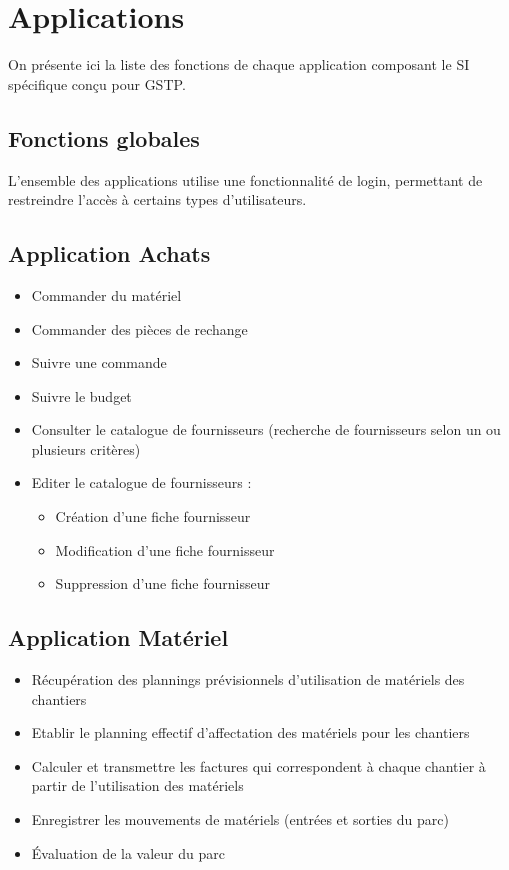 \section{Applications}

On présente ici la liste des fonctions de chaque application composant le
SI spécifique conçu pour GSTP.


\subsection{Fonctions globales}

L'ensemble des applications utilise une fonctionnalité de login, permettant
de restreindre l'accès à certains types d'utilisateurs.


\subsection{Application Achats}

\begin{itemize}
\item Commander du matériel
\item Commander des pièces de rechange
\item Suivre une commande
\item Suivre le budget
\item Consulter le catalogue de fournisseurs (recherche de fournisseurs selon 
un ou plusieurs critères)
\item Editer le catalogue de fournisseurs :
	\begin{itemize}
	\item Création d'une fiche fournisseur
	\item Modification d'une fiche fournisseur
	\item Suppression d'une fiche fournisseur
	\end{itemize}
\end{itemize}

\subsection{Application Matériel}
\begin{itemize}
\item Récupération des plannings prévisionnels d'utilisation de matériels
des chantiers
\item Etablir le planning effectif d'affectation des
matériels pour les chantiers
\item Calculer et transmettre les factures qui correspondent à chaque chantier
à partir de l'utilisation des matériels
\item Enregistrer les mouvements de matériels (entrées et sorties du parc)
\item Évaluation de la valeur du parc
\end{itemize}


